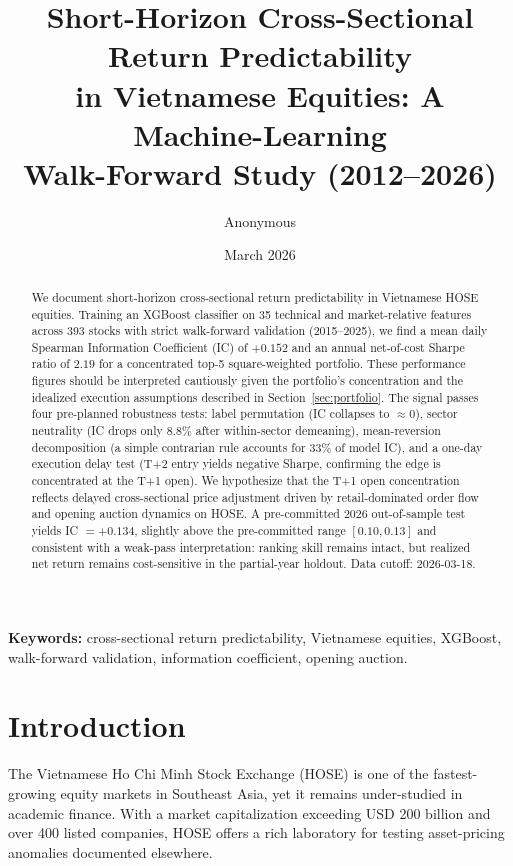 \documentclass[12pt,a4paper]{article}
\title{Short-Horizon Cross-Sectional Return Predictability\\
       in Vietnamese Equities: A Machine-Learning\\
       Walk-Forward Study (2012--2026)}
\author{Anonymous}
\date{March 2026}
\begin{document}
\maketitle

\begin{abstract}
We document short-horizon cross-sectional return predictability in Vietnamese HOSE
equities. Training an XGBoost classifier on 35 technical and market-relative features
across 393 stocks with strict walk-forward validation (2015--2025), we find a mean
daily Spearman Information Coefficient (IC) of $+0.152$ and an annual net-of-cost
Sharpe ratio of $2.19$ for a concentrated top-5 square-weighted portfolio.
These performance figures should be interpreted cautiously given the portfolio's
concentration and the idealized execution assumptions described in
Section~\ref{sec:portfolio}.
The signal passes four pre-planned robustness tests: label permutation (IC collapses
to $\approx 0$), sector neutrality (IC drops only $8.8\%$ after within-sector
demeaning), mean-reversion decomposition (a simple contrarian rule accounts for
$33\%$ of model IC), and a one-day execution delay test (T+2 entry yields negative
Sharpe, confirming the edge is concentrated at the T+1 open).
We hypothesize that the T+1 open concentration reflects delayed cross-sectional
price adjustment driven by retail-dominated order flow and opening auction dynamics
on HOSE. A pre-committed 2026 out-of-sample test yields IC $= +0.134$, slightly
above the pre-committed range $[0.10, 0.13]$ and consistent with a weak-pass
interpretation: ranking skill remains intact, but realized net return remains
cost-sensitive in the partial-year holdout.
Data cutoff: 2026-03-18.
\end{abstract}

\textbf{Keywords:} cross-sectional return predictability, Vietnamese equities,
XGBoost, walk-forward validation, information coefficient, opening auction.

\newpage

\section{Introduction}

The Vietnamese Ho Chi Minh Stock Exchange (HOSE) is one of the fastest-growing
equity markets in Southeast Asia, yet it remains under-studied in academic finance.
With a market capitalization exceeding USD 200 billion and over 400 listed companies,
HOSE offers a rich laboratory for testing asset-pricing anomalies documented elsewhere.
\end{document}
